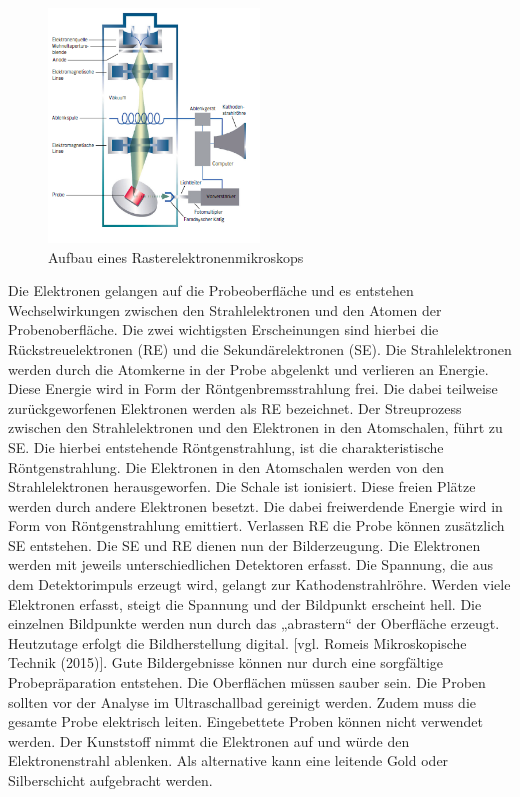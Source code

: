 \documentclass[a4paper, 11pt]{tubsreprt}
\begin{document}
\begin{figure} %
\centering
\includegraphics[width=0.5\textwidth]{Bilder/REM.png}
\caption{Aufbau eines Rasterelektronenmikroskops}
\label{REM Aufbau}
\end{figure}

Die Elektronen gelangen auf die Probeoberfläche und es entstehen Wechselwirkungen zwischen den Strahlelektronen und den Atomen der Probenoberfläche. Die zwei wichtigsten Erscheinungen sind hierbei die Rückstreuelektronen (RE) und die Sekundärelektronen (SE). Die Strahlelektronen werden durch die Atomkerne in der Probe abgelenkt  und verlieren an Energie. Diese Energie wird in Form der Röntgenbremsstrahlung frei. Die dabei teilweise zurückgeworfenen Elektronen werden als RE bezeichnet. Der Streuprozess zwischen den Strahlelektronen und den Elektronen in den Atomschalen, führt zu SE. Die hierbei entstehende Röntgenstrahlung, ist die charakteristische Röntgenstrahlung. Die Elektronen in den Atomschalen werden von den Strahlelektronen herausgeworfen. Die Schale ist ionisiert. Diese freien Plätze werden durch andere Elektronen besetzt. Die dabei freiwerdende Energie wird in Form von Röntgenstrahlung emittiert. Verlassen RE die Probe können zusätzlich SE entstehen.
Die SE und RE dienen nun der Bilderzeugung. Die Elektronen werden mit jeweils unterschiedlichen Detektoren erfasst. Die Spannung, die aus dem Detektorimpuls erzeugt wird, gelangt zur Kathodenstrahlröhre. Werden viele Elektronen erfasst, steigt die Spannung und der Bildpunkt erscheint hell. Die einzelnen Bildpunkte werden nun durch das „abrastern“ der Oberfläche erzeugt. Heutzutage erfolgt die Bildherstellung digital. [vgl. Romeis Mikroskopische Technik (2015)].
Gute Bildergebnisse können nur durch eine sorgfältige Probepräparation entstehen. Die Oberflächen müssen sauber sein. Die Proben sollten vor der Analyse im Ultraschallbad gereinigt werden.  Zudem muss die gesamte Probe elektrisch leiten. Eingebettete Proben können nicht verwendet werden. Der Kunststoff nimmt die Elektronen auf und würde den Elektronenstrahl ablenken. Als alternative kann eine leitende Gold oder Silberschicht aufgebracht werden.
\end{document}

